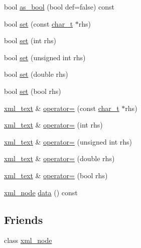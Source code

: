 \begin{DoxyCompactItemize}
\item 
bool \hyperlink{classpugi_1_1xml__text_ab591c10f3adc62024cf8ffc53c4e372e}{as\-\_\-bool} (bool def=false) const 
\item 
bool \hyperlink{classpugi_1_1xml__text_ab31930ff4f5ad568549f85dbb697e60e}{set} (const \hyperlink{namespacepugi_aef5a7a62cba0507542220ea15afe39df}{char\-\_\-t} $\ast$rhs)
\item 
bool \hyperlink{classpugi_1_1xml__text_a66ebe5bd62e843197305ed68661b0a26}{set} (int rhs)
\item 
bool \hyperlink{classpugi_1_1xml__text_a9d780e113aa0b1f4bbf2d0a88fe2c42f}{set} (unsigned int rhs)
\item 
bool \hyperlink{classpugi_1_1xml__text_acf32e49c31a07f7bad1f9bdfb71bdc1e}{set} (double rhs)
\item 
bool \hyperlink{classpugi_1_1xml__text_a0d75ccc7ede3b3d590352267a0f0fcb9}{set} (bool rhs)
\item 
\hyperlink{classpugi_1_1xml__text}{xml\-\_\-text} \& \hyperlink{classpugi_1_1xml__text_a0b895996d14f50afca11b9a82276038d}{operator=} (const \hyperlink{namespacepugi_aef5a7a62cba0507542220ea15afe39df}{char\-\_\-t} $\ast$rhs)
\item 
\hyperlink{classpugi_1_1xml__text}{xml\-\_\-text} \& \hyperlink{classpugi_1_1xml__text_a594653404f095b07d4644a0567f9ec51}{operator=} (int rhs)
\item 
\hyperlink{classpugi_1_1xml__text}{xml\-\_\-text} \& \hyperlink{classpugi_1_1xml__text_a48e2aa3796629258d1f037d1bc2277f7}{operator=} (unsigned int rhs)
\item 
\hyperlink{classpugi_1_1xml__text}{xml\-\_\-text} \& \hyperlink{classpugi_1_1xml__text_a0ff3e37177494d9cdfa073c6392ca405}{operator=} (double rhs)
\item 
\hyperlink{classpugi_1_1xml__text}{xml\-\_\-text} \& \hyperlink{classpugi_1_1xml__text_afd64e76239853fcf57e80b8f43a3fb4d}{operator=} (bool rhs)
\item 
\hyperlink{classpugi_1_1xml__node}{xml\-\_\-node} \hyperlink{classpugi_1_1xml__text_a30ca257f1614159c625d2904a6285224}{data} () const 
\end{DoxyCompactItemize}
\subsection*{Friends}
\begin{DoxyCompactItemize}
\item 
class \hyperlink{classpugi_1_1xml__text_a156d917a92815c7b593bd5ef19f6d5fb}{xml\-\_\-node}
\end{DoxyCompactItemize}


